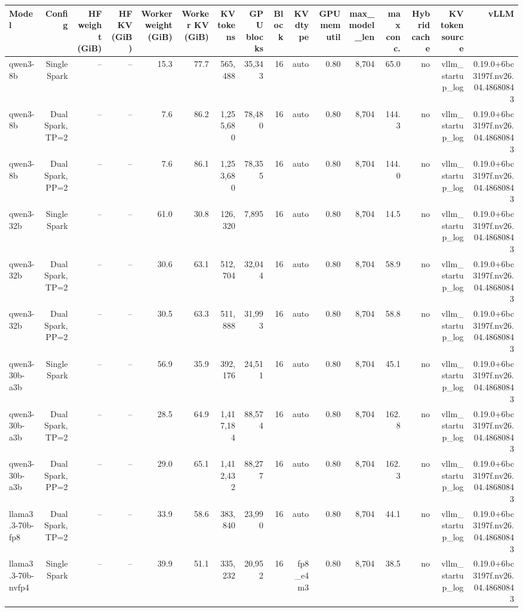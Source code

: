 \begin{tabular}{l r r r r r r r r r r r r r r r }
\toprule
Model & Config & HF weight (GiB) & HF KV (GiB) & Worker weight (GiB) & Worker KV (GiB) & KV tokens & GPU blocks & Block & KV dtype & GPU mem util & max\_model\_len & max conc. & Hybrid cache & KV token source & vLLM \\
\midrule
qwen3-8b & Single Spark & -- & -- & 15.3 & 77.7 & 565,488 & 35,343 & 16 & auto & 0.80 & 8,704 & 65.0 & no & vllm\_startup\_log & 0.19.0+6bc3197f.nv26.04.48680843 \\
qwen3-8b & Dual Spark, TP=2 & -- & -- & 7.6 & 86.2 & 1,255,680 & 78,480 & 16 & auto & 0.80 & 8,704 & 144.3 & no & vllm\_startup\_log & 0.19.0+6bc3197f.nv26.04.48680843 \\
qwen3-8b & Dual Spark, PP=2 & -- & -- & 7.6 & 86.1 & 1,253,680 & 78,355 & 16 & auto & 0.80 & 8,704 & 144.0 & no & vllm\_startup\_log & 0.19.0+6bc3197f.nv26.04.48680843 \\
qwen3-32b & Single Spark & -- & -- & 61.0 & 30.8 & 126,320 & 7,895 & 16 & auto & 0.80 & 8,704 & 14.5 & no & vllm\_startup\_log & 0.19.0+6bc3197f.nv26.04.48680843 \\
qwen3-32b & Dual Spark, TP=2 & -- & -- & 30.6 & 63.1 & 512,704 & 32,044 & 16 & auto & 0.80 & 8,704 & 58.9 & no & vllm\_startup\_log & 0.19.0+6bc3197f.nv26.04.48680843 \\
qwen3-32b & Dual Spark, PP=2 & -- & -- & 30.5 & 63.3 & 511,888 & 31,993 & 16 & auto & 0.80 & 8,704 & 58.8 & no & vllm\_startup\_log & 0.19.0+6bc3197f.nv26.04.48680843 \\
qwen3-30b-a3b & Single Spark & -- & -- & 56.9 & 35.9 & 392,176 & 24,511 & 16 & auto & 0.80 & 8,704 & 45.1 & no & vllm\_startup\_log & 0.19.0+6bc3197f.nv26.04.48680843 \\
qwen3-30b-a3b & Dual Spark, TP=2 & -- & -- & 28.5 & 64.9 & 1,417,184 & 88,574 & 16 & auto & 0.80 & 8,704 & 162.8 & no & vllm\_startup\_log & 0.19.0+6bc3197f.nv26.04.48680843 \\
qwen3-30b-a3b & Dual Spark, PP=2 & -- & -- & 29.0 & 65.1 & 1,412,432 & 88,277 & 16 & auto & 0.80 & 8,704 & 162.3 & no & vllm\_startup\_log & 0.19.0+6bc3197f.nv26.04.48680843 \\
llama3.3-70b-fp8 & Dual Spark, TP=2 & -- & -- & 33.9 & 58.6 & 383,840 & 23,990 & 16 & auto & 0.80 & 8,704 & 44.1 & no & vllm\_startup\_log & 0.19.0+6bc3197f.nv26.04.48680843 \\
llama3.3-70b-nvfp4 & Single Spark & -- & -- & 39.9 & 51.1 & 335,232 & 20,952 & 16 & fp8\_e4m3 & 0.80 & 8,704 & 38.5 & no & vllm\_startup\_log & 0.19.0+6bc3197f.nv26.04.48680843 \\

\end{tabular}
